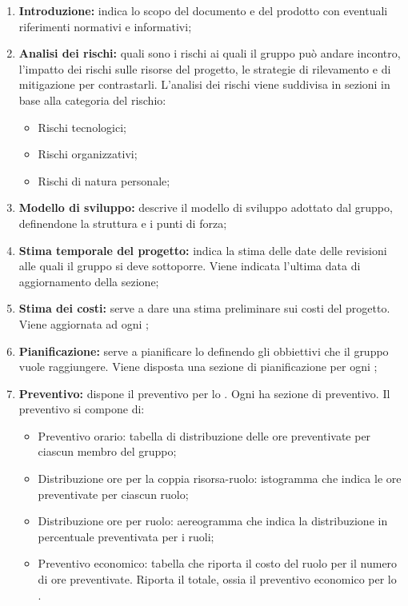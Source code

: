 \begin{enumerate}
  \item \textbf{Introduzione:} indica lo scopo del documento e del prodotto con eventuali riferimenti normativi e informativi;
  \item \textbf{Analisi dei rischi:} quali sono i rischi ai quali il gruppo può andare incontro, l'impatto dei rischi sulle risorse del progetto, le strategie di rilevamento e di mitigazione per contrastarli. L'analisi dei rischi viene suddivisa in sezioni in base alla categoria del rischio:
  \begin{itemize}
    \item Rischi tecnologici;
    \item Rischi organizzativi;
    \item Rischi di natura personale;
  \end{itemize} 
  \item \textbf{Modello di sviluppo:} descrive il modello di sviluppo adottato dal gruppo, definendone la struttura e i punti di forza;
  \item \textbf{Stima temporale del progetto:} indica la stima delle date delle revisioni alle quali il gruppo si deve sottoporre. Viene indicata l'ultima data di aggiornamento della sezione;
  \item \textbf{Stima dei costi:} serve a dare una stima preliminare sui costi del progetto. Viene aggiornata ad ogni ;
  \item \textbf{Pianificazione:} serve a pianificare lo  definendo gli obbiettivi che il gruppo vuole raggiungere. Viene disposta una sezione di pianificazione per ogni ;
  \item \textbf{Preventivo:} dispone il preventivo per lo . Ogni  ha sezione di preventivo. Il preventivo si compone di:
  \begin{itemize}
    \item Preventivo orario: tabella di distribuzione delle ore preventivate per ciascun membro del gruppo;
    \item Distribuzione ore per la coppia risorsa-ruolo: istogramma che indica le ore preventivate per ciascun ruolo;
    \item Distribuzione ore per ruolo: aereogramma che indica la distribuzione in percentuale preventivata per i ruoli;
    \item Preventivo economico: tabella che riporta il costo del ruolo per il numero di ore preventivate. Riporta il totale, ossia il preventivo economico per lo .

\end{itemize}
\end{enumerate}
